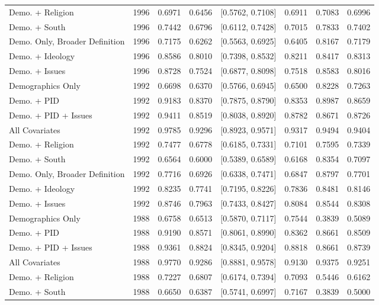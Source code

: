 \begin{longtable}{lrrrlrrr}
  Demo. + Religion & 1996 & 0.6971 & 0.6456 & [0.5762, 0.7108] & 0.6911 & 0.7083 & 0.6996 \\ 
  Demo. + South & 1996 & 0.7442 & 0.6796 & [0.6112, 0.7428] & 0.7015 & 0.7833 & 0.7402 \\ 
  Demo. Only, Broader Definition & 1996 & 0.7175 & 0.6262 & [0.5563, 0.6925] & 0.6405 & 0.8167 & 0.7179 \\ 
  Demo. + Ideology & 1996 & 0.8586 & 0.8010 & [0.7398, 0.8532] & 0.8211 & 0.8417 & 0.8313 \\ 
  Demo. + Issues & 1996 & 0.8728 & 0.7524 & [0.6877, 0.8098] & 0.7518 & 0.8583 & 0.8016 \\ 
  Demographics Only & 1992 & 0.6698 & 0.6370 & [0.5766, 0.6945] & 0.6500 & 0.8228 & 0.7263 \\ 
  Demo. + PID & 1992 & 0.9183 & 0.8370 & [0.7875, 0.8790] & 0.8353 & 0.8987 & 0.8659 \\ 
  Demo. + PID + Issues & 1992 & 0.9411 & 0.8519 & [0.8038, 0.8920] & 0.8782 & 0.8671 & 0.8726 \\ 
  All Covariates & 1992 & 0.9785 & 0.9296 & [0.8923, 0.9571] & 0.9317 & 0.9494 & 0.9404 \\ 
  Demo. + Religion & 1992 & 0.7477 & 0.6778 & [0.6185, 0.7331] & 0.7101 & 0.7595 & 0.7339 \\ 
  Demo. + South & 1992 & 0.6564 & 0.6000 & [0.5389, 0.6589] & 0.6168 & 0.8354 & 0.7097 \\ 
  Demo. Only, Broader Definition & 1992 & 0.7716 & 0.6926 & [0.6338, 0.7471] & 0.6847 & 0.8797 & 0.7701 \\ 
  Demo. + Ideology & 1992 & 0.8235 & 0.7741 & [0.7195, 0.8226] & 0.7836 & 0.8481 & 0.8146 \\ 
  Demo. + Issues & 1992 & 0.8746 & 0.7963 & [0.7433, 0.8427] & 0.8084 & 0.8544 & 0.8308 \\ 
  Demographics Only & 1988 & 0.6758 & 0.6513 & [0.5870, 0.7117] & 0.7544 & 0.3839 & 0.5089 \\ 
  Demo. + PID & 1988 & 0.9190 & 0.8571 & [0.8061, 0.8990] & 0.8362 & 0.8661 & 0.8509 \\ 
  Demo. + PID + Issues & 1988 & 0.9361 & 0.8824 & [0.8345, 0.9204] & 0.8818 & 0.8661 & 0.8739 \\ 
  All Covariates & 1988 & 0.9770 & 0.9286 & [0.8881, 0.9578] & 0.9130 & 0.9375 & 0.9251 \\ 
  Demo. + Religion & 1988 & 0.7227 & 0.6807 & [0.6174, 0.7394] & 0.7093 & 0.5446 & 0.6162 \\ 
  Demo. + South & 1988 & 0.6650 & 0.6387 & [0.5741, 0.6997] & 0.7167 & 0.3839 & 0.5000 \\ 

\end{longtable}
